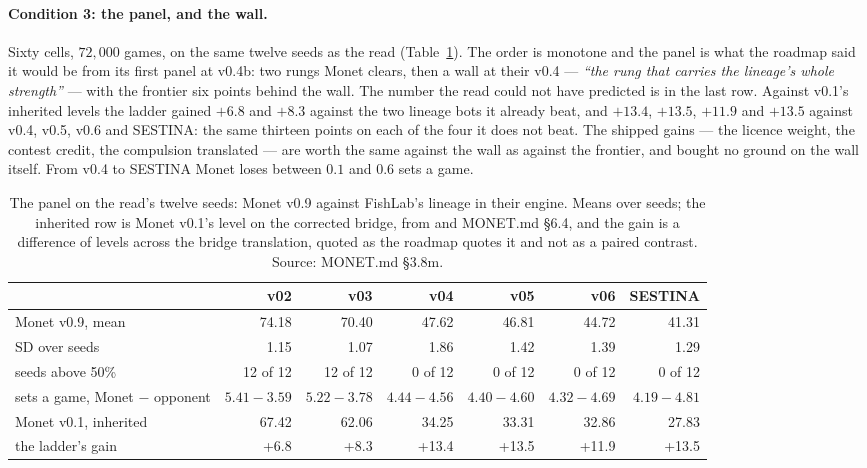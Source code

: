\documentclass[11pt]{article}
\newcommand{\monet}{MONET.md}
\begin{document}
\paragraph{Condition 3: the panel, and the wall.} Sixty cells, $72{,}000$ games, on the same
twelve seeds as the read (Table~\ref{tab:panel}). The order is monotone and the panel is what the
roadmap said it would be from its first panel at v0.4b: two rungs Monet clears, then a wall at
their v0.4 --- \emph{``the rung that carries the lineage's whole strength''} \cite{monet} --- with
the frontier six points behind the wall. The number the read could not have predicted is in the last
row. Against v0.1's inherited levels the ladder gained $+6.8$ and $+8.3$ against the two lineage bots
it already beat, and $+13.4$, $+13.5$, $+11.9$ and $+13.5$ against v0.4, v0.5, v0.6 and SESTINA:
the same thirteen points on each of the four it does not beat. The shipped gains --- the licence
weight, the contest credit, the compulsion translated --- are worth the same against the wall as
against the frontier, and bought no ground on the wall itself. From v0.4 to SESTINA Monet loses
between $0.1$ and $0.6$ sets a game.

\begin{table}[t]
\centering\small
\caption{The panel on the read's twelve seeds: Monet v0.9 against FishLab's lineage in their engine.
Means over seeds; the inherited row is Monet v0.1's level on the corrected bridge, from
\cite{frontier} and \monet{} \S6.4, and the gain is a difference of levels across the bridge
translation, quoted as the roadmap quotes it and not as a paired contrast. Source: \monet{} \S3.8m.}
\label{tab:panel}
\begin{tabular}{@{}lrrrrrr@{}}
\toprule
 & v02 & v03 & v04 & v05 & v06 & SESTINA \\
\midrule
Monet v0.9, mean & 74.18 & 70.40 & 47.62 & 46.81 & 44.72 & 41.31 \\
SD over seeds & 1.15 & 1.07 & 1.86 & 1.42 & 1.39 & 1.29 \\
seeds above 50\% & 12 of 12 & 12 of 12 & 0 of 12 & 0 of 12 & 0 of 12 & 0 of 12 \\
sets a game, Monet $-$ opponent & $5.41-3.59$ & $5.22-3.78$ & $4.44-4.56$ & $4.40-4.60$ & $4.32-4.69$ & $4.19-4.81$ \\
Monet v0.1, inherited & 67.42 & 62.06 & 34.25 & 33.31 & 32.86 & 27.83 \\
the ladder's gain & +6.8 & +8.3 & +13.4 & +13.5 & +11.9 & +13.5 \\
\bottomrule
\end{tabular}
\end{table}
\end{document}
